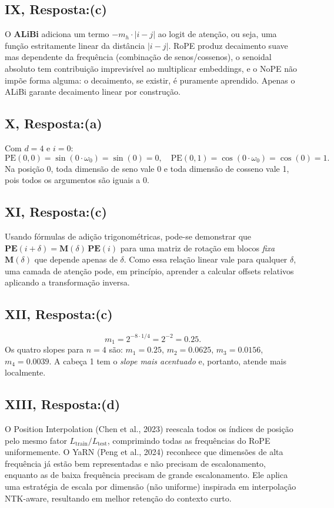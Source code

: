 \documentclass{dlproblemset}
\begin{document}
\subsection*{IX, Resposta:(c)}
O \textbf{ALiBi} adiciona um termo $-m_h \cdot |i - j|$ ao logit de atenção, ou seja,
uma função estritamente linear da distância $|i - j|$. RoPE produz decaimento suave
mas dependente da frequência (combinação de senos/cossenos), o senoidal absoluto tem
contribuição imprevisível ao multiplicar embeddings, e o NoPE não impõe forma alguma:
o decaimento, se existir, é puramente aprendido. Apenas o ALiBi garante decaimento
linear por construção.

\subsection*{X, Resposta:(a)}
Com $d = 4$ e $i = 0$:
\[
  \mathrm{PE}(0, 0) = \sin(0 \cdot \omega_0) = \sin(0) = 0,\quad
  \mathrm{PE}(0, 1) = \cos(0 \cdot \omega_0) = \cos(0) = 1.
\]
Na posição 0, toda dimensão de seno vale 0 e toda dimensão de cosseno vale 1, pois
todos os argumentos são iguais a 0.

\subsection*{XI, Resposta:(c)}
Usando fórmulas de adição trigonométricas, pode-se demonstrar que
$\mathbf{PE}(i + \delta) = \mathbf{M}(\delta)\,\mathbf{PE}(i)$
para uma matriz de rotação em blocos \emph{fixa} $\mathbf{M}(\delta)$ que depende apenas de
$\delta$. Como essa relação linear vale para qualquer $\delta$, uma camada de atenção
pode, em princípio, aprender a calcular offsets relativos aplicando a transformação
inversa.

\subsection*{XII, Resposta:(c)}
\[
  m_1 = 2^{-8 \cdot 1/4} = 2^{-2} = 0.25.
\]
Os quatro slopes para $n=4$ são: $m_1=0.25$, $m_2=0.0625$, $m_3=0.0156$,
$m_4=0.0039$. A cabeça 1 tem o \emph{slope mais acentuado} e, portanto, atende
mais localmente.

\subsection*{XIII, Resposta:(d)}
O Position Interpolation (Chen et al., 2023) reescala todos os índices de posição pelo
mesmo fator $L_{\mathrm{train}} / L_{\mathrm{test}}$, comprimindo todas as frequências
do RoPE uniformemente. O YaRN (Peng et al., 2024) reconhece que dimensões de alta
frequência já estão bem representadas e não precisam de escalonamento, enquanto as de
baixa frequência precisam de grande escalonamento. Ele aplica uma estratégia de escala
por dimensão (não uniforme) inspirada em interpolação NTK-aware, resultando em melhor
retenção do contexto curto.
\end{document}
